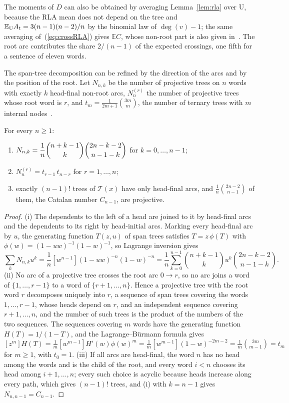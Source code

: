 \documentclass[mathematics,article,submit,pdftex,oneauthor]{Definitions/mdpi}
\newcommand{\T}{\mathcal T}
\newcommand{\E}{\mathbb E}
\begin{document}
The moments of $D$ can also be obtained by averaging Lemma~\ref{lem:rla} over U, because the RLA mean does not depend on the tree and $\E_{\rm U}A_t=3(n-1)(n-2)/n$ by the binomial law of $\deg(v)-1$; the same averaging of~(\ref{eq:crossRLA}) gives $\E C$, whose non-root part is also given in~\cite{FerreriCancho2018}.
The root arc contributes the share $2/(n-1)$ of the expected crossings, one fifth for a sentence of eleven words.

The span-tree decomposition can be refined by the direction of the arcs and by the position of the root.
Let $N_{n,k}$ be the number of projective trees on $n$ words with exactly $k$ head-final non-root arcs, $N^{(r)}_n$ the number of projective trees whose root word is $r$, and $t_m=\frac{1}{2m+1}\binom{3m}{m}$, the number of ternary trees with $m$ internal nodes~\cite{OEIS_A001764}.

\begin{Theorem}\label{thm:direction}
For every $n\geqslant1$:
\begin{enumerate}
\item $N_{n,k}=\dfrac1n\dbinom{n+k-1}{k}\dbinom{2n-k-2}{n-1-k}$ for $k=0,\dots,n-1$;
\item $N^{(r)}_n=t_{r-1}\,t_{n-r}$ for $r=1,\dots,n$;
\item exactly $(n-1)!$ trees of $\T(x)$ have only head-final arcs, and $\frac1n\binom{2n-2}{n-1}$ of them, the Catalan number $C_{n-1}$, are projective.
\end{enumerate}
\end{Theorem}
\begin{proof}
(i) The dependents to the left of a head are joined to it by head-final arcs and the dependents to its right by head-initial arcs.
Marking every head-final arc by $u$, the generating function $T(z,u)$ of span trees satisfies $T=z\,\phi(T)$ with $\phi(w)=(1-uw)^{-1}(1-w)^{-1}$, so Lagrange inversion gives
\[
\sum_kN_{n,k}u^k=\frac1n[w^{n-1}](1-uw)^{-n}(1-w)^{-n}=\frac1n\sum_{k=0}^{n-1}\binom{n+k-1}{k}u^k\binom{2n-k-2}{n-1-k}.
\]
(ii) No arc of a projective tree crosses the root arc $0\to r$, so no arc joins a word of $\{1,\dots,r-1\}$ to a word of $\{r+1,\dots,n\}$.
Hence a projective tree with the root word $r$ decomposes uniquely into $r$, a sequence of span trees covering the words $1,\dots,r-1$, whose heads depend on $r$, and an independent sequence covering $r+1,\dots,n$, and the number of such trees is the product of the numbers of the two sequences.
The sequences covering $m$ words have the generating function $H(T)=1/(1-T)$, and the Lagrange--B\"urmann formula gives $[z^m]H(T)=\frac1m[w^{m-1}]H'(w)\phi(w)^m=\frac1m[w^{m-1}](1-w)^{-2m-2}=\frac1m\binom{3m}{m-1}=t_m$ for $m\geqslant1$, with $t_0=1$.
(iii) If all arcs are head-final, the word $n$ has no head among the words and is the child of the root, and every word $i<n$ chooses its head among $i+1,\dots,n$; every such choice is acyclic because heads increase along every path, which gives $(n-1)!$ trees, and (i) with $k=n-1$ gives $N_{n,n-1}=C_{n-1}$.
\end{proof}
\end{document}
